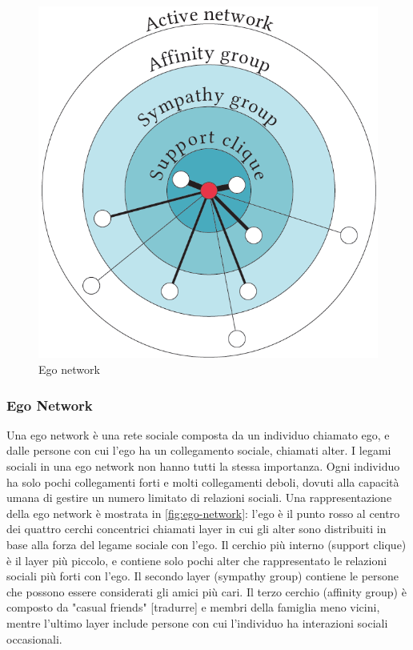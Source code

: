\documentclass[12pt,italian]{report}
\begin{document}
\begin{figure}
  \centering
  \includegraphics[scale=0.50]{immagini/ego-network.png}
  \caption{Ego network}
  \label{fig:ego-network}
\end{figure}

\subsubsection{Ego Network}
Una ego network è una rete sociale composta da un individuo chiamato ego, e dalle persone con cui l'ego ha un collegamento sociale, chiamati alter. I legami sociali in una ego network non hanno tutti la stessa importanza. Ogni individuo ha solo pochi collegamenti forti e molti collegamenti deboli, dovuti alla capacità umana di gestire un numero limitato di relazioni sociali. Una rappresentazione della ego network è mostrata in \autoref{fig:ego-network}: l'ego è il punto rosso al centro dei quattro cerchi concentrici chiamati layer in cui gli alter sono distribuiti in base alla forza del legame sociale con l'ego. Il cerchio più interno (support clique) è il layer più piccolo, e contiene solo pochi alter che rappresentato le relazioni sociali più forti con l'ego. Il secondo layer (sympathy group) contiene le persone che possono essere considerati gli amici più cari. Il terzo cerchio (affinity group) è composto da "casual friends" [tradurre] e membri della famiglia meno vicini, mentre l'ultimo layer include persone con cui l'individuo ha interazioni sociali occasionali.
\end{document}
